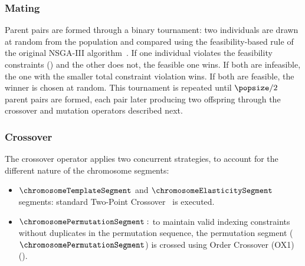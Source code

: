 \subsubsection{Mating}

Parent pairs are formed through a binary tournament: two individuals are drawn at random from the population and compared using the feasibility-based rule of the original NSGA-III algorithm~\cite{nsga-iii-pt2}. If one individual violates the feasibility constraints () and the other does not, the feasible one wins. If both are infeasible, the one with the smaller total constraint violation wins. If both are feasible, the winner is chosen at random. This tournament is repeated until $\popsize/2$ parent pairs are formed, each pair later producing two offspring through the crossover and mutation operators described next.

\subsubsection{Crossover}

The crossover operator applies two concurrent strategies, to account for the different nature of the chromosome segments:

\begin{itemize}
    \item \textbf{$\chromosomeTemplateSegment$} and \textbf{$\chromosomeElasticitySegment$} segments: standard Two-Point Crossover~\cite{crossovers} is executed.
    \item \textbf{$\chromosomePermutationSegment: $} to maintain valid indexing constraints without duplicates in the permutation sequence, the permutation segment ($\chromosomePermutationSegment$) is crossed using Order Crossover (OX1)~\cite{crossovers} ().
\end{itemize}

